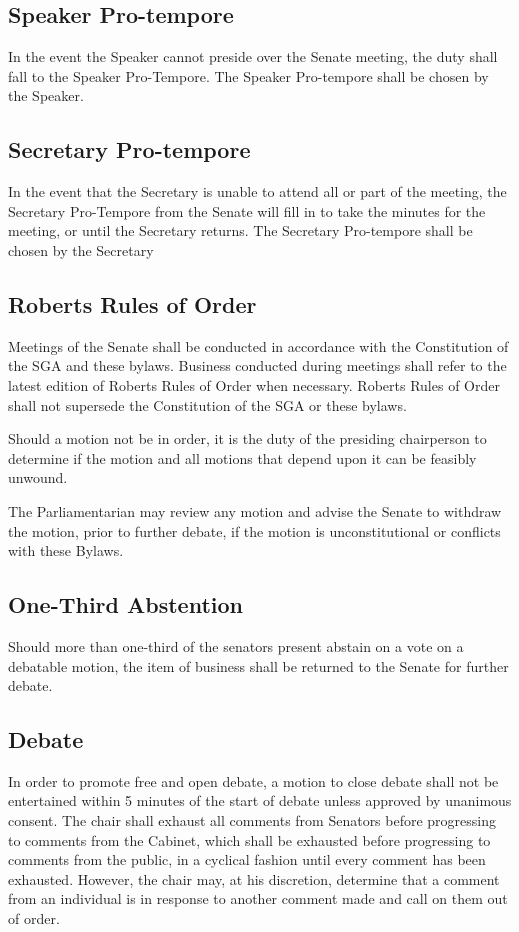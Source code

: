 \documentclass[12pt]{scrreprt}
\begin{document}
\subsection{Speaker Pro-tempore}
In the event the Speaker cannot preside over the Senate meeting, the duty 
shall fall to the Speaker Pro-Tempore. The Speaker Pro-tempore shall be chosen 
by the Speaker. 

\subsection{Secretary Pro-tempore}
In the event that the Secretary is unable to attend all or part of the 
meeting, the Secretary Pro-Tempore from the Senate will fill in to take the 
minutes for the meeting, or until the Secretary returns. The Secretary 
Pro-tempore shall be chosen by the Secretary

\subsection{Roberts Rules of Order}
Meetings of the Senate shall be conducted in accordance with the Constitution 
of the SGA and these bylaws. Business conducted during meetings shall refer to 
the latest edition of Roberts Rules of Order when necessary. Roberts Rules of 
Order shall not supersede the Constitution of the SGA or these bylaws. 

Should a motion not be in order, it is the duty of the presiding chairperson 
to determine if the motion and all motions that depend upon it can be feasibly 
unwound. 

The Parliamentarian may review any motion and advise the Senate to withdraw 
the motion, prior to further debate, if the motion is unconstitutional or 
conflicts with these Bylaws. 

\subsection{One-Third Abstention}
Should more than one-third of the senators present abstain on a vote on a 
debatable motion, the item of business shall be returned to the Senate for 
further debate. 

\subsection{Debate}
In order to promote free and open debate, a motion to close debate shall not 
be entertained within 5 minutes of the start of debate unless approved by 
unanimous consent. The chair shall exhaust all comments from Senators before 
progressing to comments from the Cabinet, which shall be exhausted before 
progressing to comments from the public, in a cyclical fashion until every 
comment has been exhausted. However, the chair may, at his discretion, 
determine that a comment from an individual is in response to another comment 
made and call on them out of order. 
\end{document}
